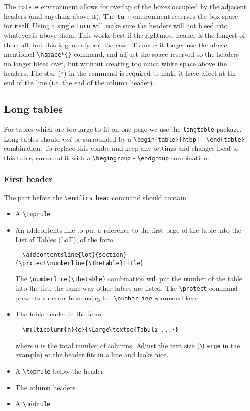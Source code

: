 \documentclass{report}
\begin{document}
The \verb+rotate+ environment allows for overlap of the boxes occupied by
the adjacent headers (and anything above it).
The \verb+turn+ environment reserves the box space for itself.
Using a single \verb+turn+ will make sure the headers will not bleed into
whatever is above them.
This works best if the rightmost header is the longest of them all, but this
is generaly not the case. To make it longer use the above mentioned
\verb+\hspace*{}+ command, and adjust the space reserved so the headers no longer
bleed over, but without creating too much white space above the headers.
The star (\verb+*+) in the command is required to make it have effect at
the end of the line (i.e. the end of the column header).

\subsection{Long tables}
For tables which are too large to fit on one page we use the \verb+longtable+
package.
Long tables should \emph{not} be surrounded by a
\verb+\begin{table}[htbp]+ - \verb+\end{table}+ combination.
To replace this combo and keep any settings and changes local to this table,
surround it with a \verb+\begingroup+ - \verb+\endgroup+ combination.

\subsubsection{First header}
The part before the \verb+\endfirsthead+ command should contain:
\begin{itemize}
\item A \verb+\toprule+
\item An addcontents line to put a reference to the first page of the table
into the List of Tables (LoT), of the form
\begin{verbatim}
  \addcontentsline{lot}{section}{\protect\numberline{\thetable}Title}
\end{verbatim}
The \verb+\numberline{\thetable}+ combination will put the number of the
table into the list, the same way other tables are listed.
The \verb+\protect+ command prevents an error from using the \verb+\numberline+
command here.
\item The table header in the form
\begin{verbatim}
  \multicolumn{n}{c}{\Large\textsc{Tabula ...}}
\end{verbatim}
where \verb+n+ is the total number of columns. Adjust the text size
(\verb+\Large+ in the example) so the header fits in a line and looks nice.
\item A \verb+\toprule+ below the header
\item The column headers
\item A \verb+\midrule+
\end{itemize}
\end{document}
